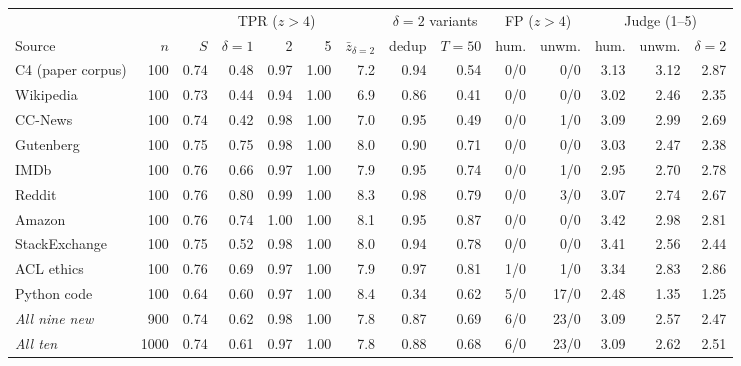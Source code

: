 \begin{tabular}{@{}l r r rrr r rr rr rrr@{}}
\toprule
 & & & \multicolumn{3}{c}{TPR ($z>4$)} & & \multicolumn{2}{c}{$\delta{=}2$ variants} & \multicolumn{2}{c}{FP ($z>4$)} & \multicolumn{3}{c}{Judge (1--5)} \\
\cmidrule(lr){4-6}\cmidrule(lr){8-9}\cmidrule(lr){10-11}\cmidrule(lr){12-14}
Source & $n$ & $S$ & $\delta{=}1$ & 2 & 5 & $\bar z_{\delta=2}$ & dedup & $T{=}50$ & hum. & unwm. & hum. & unwm. & $\delta{=}2$ \\
\midrule
C4 (paper corpus) & 100 & 0.74 & 0.48 & 0.97 & 1.00 & 7.2 & 0.94 & 0.54 & 0/0 & 0/0 & 3.13 & 3.12 & 2.87 \\
Wikipedia & 100 & 0.73 & 0.44 & 0.94 & 1.00 & 6.9 & 0.86 & 0.41 & 0/0 & 0/0 & 3.02 & 2.46 & 2.35 \\
CC-News & 100 & 0.74 & 0.42 & 0.98 & 1.00 & 7.0 & 0.95 & 0.49 & 0/0 & 1/0 & 3.09 & 2.99 & 2.69 \\
Gutenberg & 100 & 0.75 & 0.75 & 0.98 & 1.00 & 8.0 & 0.90 & 0.71 & 0/0 & 0/0 & 3.03 & 2.47 & 2.38 \\
IMDb & 100 & 0.76 & 0.66 & 0.97 & 1.00 & 7.9 & 0.95 & 0.74 & 0/0 & 1/0 & 2.95 & 2.70 & 2.78 \\
Reddit & 100 & 0.76 & 0.80 & 0.99 & 1.00 & 8.3 & 0.98 & 0.79 & 0/0 & 3/0 & 3.07 & 2.74 & 2.67 \\
Amazon & 100 & 0.76 & 0.74 & 1.00 & 1.00 & 8.1 & 0.95 & 0.87 & 0/0 & 0/0 & 3.42 & 2.98 & 2.81 \\
StackExchange & 100 & 0.75 & 0.52 & 0.98 & 1.00 & 8.0 & 0.94 & 0.78 & 0/0 & 0/0 & 3.41 & 2.56 & 2.44 \\
ACL ethics & 100 & 0.76 & 0.69 & 0.97 & 1.00 & 7.9 & 0.97 & 0.81 & 1/0 & 1/0 & 3.34 & 2.83 & 2.86 \\
Python code & 100 & 0.64 & 0.60 & 0.97 & 1.00 & 8.4 & 0.34 & 0.62 & 5/0 & 17/0 & 2.48 & 1.35 & 1.25 \\
\midrule
\textit{All nine new} & 900 & 0.74 & 0.62 & 0.98 & 1.00 & 7.8 & 0.87 & 0.69 & 6/0 & 23/0 & 3.09 & 2.57 & 2.47 \\
\textit{All ten} & 1000 & 0.74 & 0.61 & 0.97 & 1.00 & 7.8 & 0.88 & 0.68 & 6/0 & 23/0 & 3.09 & 2.62 & 2.51 \\
\bottomrule
\end{tabular}